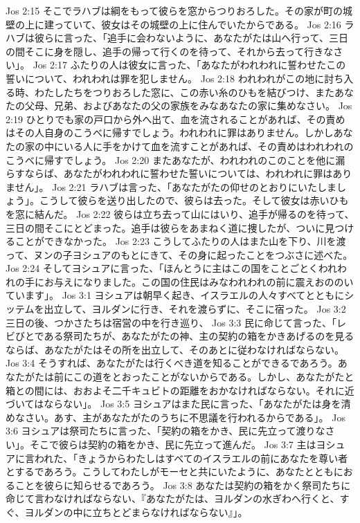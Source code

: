 Jos 2:15  そこでラハブは綱をもって彼らを窓からつりおろした。その家が町の城壁の上に建っていて、彼女はその城壁の上に住んでいたからである。
Jos 2:16  ラハブは彼らに言った、「追手に会わないように、あなたがたは山へ行って、三日の間そこに身を隠し、追手の帰って行くのを待って、それから去って行きなさい」。
Jos 2:17  ふたりの人は彼女に言った、「あなたがわれわれに誓わせたこの誓いについて、われわれは罪を犯しません。
Jos 2:18  われわれがこの地に討ち入る時、わたしたちをつりおろした窓に、この赤い糸のひもを結びつけ、またあなたの父母、兄弟、およびあなたの父の家族をみなあなたの家に集めなさい。
Jos 2:19  ひとりでも家の戸口から外へ出て、血を流されることがあれば、その責めはその人自身のこうべに帰すでしょう。われわれに罪はありません。しかしあなたの家の中にいる人に手をかけて血を流すことがあれば、その責めはわれわれのこうべに帰すでしょう。
Jos 2:20  またあなたが、われわれのこのことを他に漏らすならば、あなたがわれわれに誓わせた誓いについては、われわれに罪はありません」。
Jos 2:21  ラハブは言った、「あなたがたの仰せのとおりにいたしましょう」。こうして彼らを送り出したので、彼らは去った。そして彼女は赤いひもを窓に結んだ。
Jos 2:22  彼らは立ち去って山にはいり、追手が帰るのを待って、三日の間そこにとどまった。追手は彼らをあまねく道に捜したが、ついに見つけることができなかった。
Jos 2:23  こうしてふたりの人はまた山を下り、川を渡って、ヌンの子ヨシュアのもとにきて、その身に起ったことをつぶさに述べた。
Jos 2:24  そしてヨシュアに言った、「ほんとうに主はこの国をことごとくわれわれの手にお与えになりました。この国の住民はみなわれわれの前に震えおののいています」。
Jos 3:1  ヨシュアは朝早く起き、イスラエルの人々すべてとともにシッテムを出立して、ヨルダンに行き、それを渡らずに、そこに宿った。
Jos 3:2  三日の後、つかさたちは宿営の中を行き巡り、
Jos 3:3  民に命じて言った、「レビびとである祭司たちが、あなたがたの神、主の契約の箱をかきあげるのを見るならば、あなたがたはその所を出立して、そのあとに従わなければならない。
Jos 3:4  そうすれば、あなたがたは行くべき道を知ることができるであろう。あなたがたは前にこの道をとおったことがないからである。しかし、あなたがたと箱との間には、おおよそ二千キュビトの距離をおかなければならない。それに近づいてはならない」。
Jos 3:5  ヨシュアはまた民に言った、「あなたがたは身を清めなさい。あす、主があなたがたのうちに不思議を行われるからである」。
Jos 3:6  ヨシュアは祭司たちに言った、「契約の箱をかき、民に先立って渡りなさい」。そこで彼らは契約の箱をかき、民に先立って進んだ。
Jos 3:7  主はヨシュアに言われた、「きょうからわたしはすべてのイスラエルの前にあなたを尊い者とするであろう。こうしてわたしがモーセと共にいたように、あなたとともにおることを彼らに知らせるであろう。
Jos 3:8  あなたは契約の箱をかく祭司たちに命じて言わなければならない、『あなたがたは、ヨルダンの水ぎわへ行くと、すぐ、ヨルダンの中に立ちとどまらなければならない』」。

